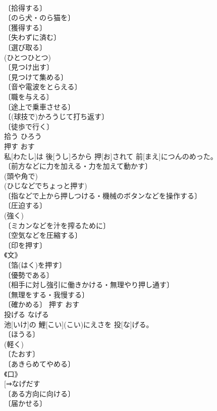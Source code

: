 \documentclass[8pt]{extreport}
\begin{document}
\begin{CJK}{UTF8}{min}
\\	〔拾得する〕 
\\	〔のら犬・のら猫を〕 
\\	〔獲得する〕 
\\	〔失わずに済む〕 
\\	〔選び取る〕 
\\	(ひとつひとつ) 
\\	〔見つけ出す〕 
\\	〔見つけて集める〕 
\\	〔音や電波をとらえる〕 
\\	〔職を与える〕 
\\	〔途上で乗車させる〕 
\\	〔(球技で)かろうじて打ち返す〕 
\\	〔徒歩で行く〕 
\\	拾う	ひろう	
\\	押す	おす	
\\	私[わたし]は 後[うし]ろから 押[お]されて 前[まえ]につんのめった。	
\\	〔前方などに力を加える・力を加えて動かす〕 
\\	(頭や角で) 
\\	(ひじなどでちょっと押す) 
\\	〔指などで上から押しつける・機械のボタンなどを操作する〕 
\\	〔圧迫する〕 
\\	(強く) 
\\	〔ミカンなどを汁を搾るために〕 
\\	〔空気などを圧縮する〕 
\\	〔印を押す〕 
\\	《文》 
\\	〔箔(はく)を押す〕 
\\	〔優勢である〕 
\\	〔相手に対し強引に働きかける・無理やり押し通す〕 
\\	〔無理をする・我慢する〕 
\\	〔確かめる〕	押す	おす	
\\	投げる	なげる	
\\	池[いけ]の 鯉[こい](こい)にえさを 投[な]げる。	
\\	〔ほうる〕 
\\	(軽く) 
\\	〔たおす〕 
\\	〔あきらめてやめる〕 
\\	《口》 
\\	[⇒なげだす 
\\	〔ある方向に向ける〕 
\\	〔届かせる〕 

\end{CJK}
\end{document}
